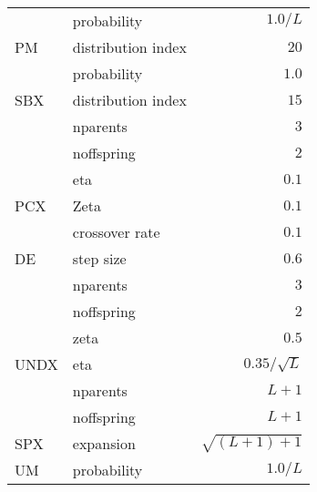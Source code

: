 \begin{table}[ht]
\begin{tabularx}{0.55\textwidth}{|l|X|r|}
                                   & probability            & $1.0 / L$        \\ \cline{2-3} 
            \multirow{-2}{*}{PM}   & distribution index     & $20$             \\ \hline
                                   & probability            & $1.0$            \\ \cline{2-3} 
            \multirow{-2}{*}{SBX}  & distribution index     & $15$             \\ \hline
                                   & nparents               & $3$              \\ \cline{2-3} 
                                   & noffspring             & $2$              \\ \cline{2-3} 
                                   & eta                    & $0.1$            \\ \cline{2-3} 
            \multirow{-4}{*}{PCX}  & Zeta                   & $0.1$            \\ \hline
                                   & crossover rate         & $0.1$            \\ \cline{2-3} 
            \multirow{-2}{*}{DE}   & step size              & $0.6$            \\ \hline
                                   & nparents               & $3$              \\ \cline{2-3} 
                                   & noffspring             & $2$              \\ \cline{2-3} 
                                   & zeta                   & $0.5$            \\ \cline{2-3} 
            \multirow{-4}{*}{UNDX} & eta                    & $0.35/\sqrt{L}$   \\ \hline
                                   & nparents               & $L+1$            \\ \cline{2-3} 
                                   & noffspring             & $L+1$            \\ \cline{2-3} 
            \multirow{-3}{*}{SPX}  & expansion              & $\sqrt{(L+1)+1}$  \\ \hline
            UM                     & probability            & $1.0/L$          \\
        \end{tabularx}
    \end{table}

